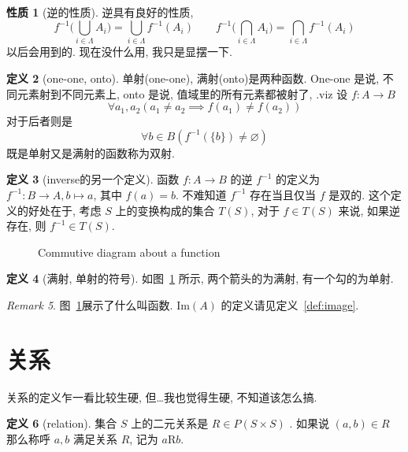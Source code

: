 \documentclass[10pt]{ctexart}
\theoremstyle{definition}
\theoremstyle{definition}
\newtheorem{definition}{定义}[section]
\newtheorem{proposition}[definition]{性质}
\theoremstyle{plain}
\theoremstyle{remark}
\newtheorem{remark}[definition]{Remark}
\begin{document}
\begin{proposition}[逆的性质]
逆具有良好的性质, 
\begin{equation}
		f^{-1} \Big(\bigcup_{i \in \Lambda}A_{i}\Big) = \bigcup_{i \in \Lambda} f^{-1} (A_{i}) \qquad
		f^{-1} \Big(\bigcap_{i \in \Lambda}A_{i}\Big) = \bigcap_{i \in \Lambda} f^{-1} (A_{i})
\end{equation}
以后会用到的. 现在没什么用, 我只是显摆一下.
\end{proposition}
\begin{definition}[one-one, onto]
单射(one-one), 满射(onto)是两种函数. One-one 是说, 不同元素射到不同元素上, onto 是说, 值域里的所有元素都被射了, .viz
设 \(f \colon A \to B\) 
\begin{equation}
	\forall a_{1} , a_{2} ( a_{1} \ne a_{2} \implies f (a_{1} ) \ne f (a_{2}) )
\end{equation}
对于后者则是
\begin{equation}
	\forall b \in B ( f^{-1} ( \{ b\} ) \ne \varnothing )
\end{equation}
既是单射又是满射的函数称为双射. 
\end{definition}
\begin{definition}[inverse的另一个定义]
	函数 \(f \colon A \to B \) 的逆 \(f ^{-1} \) 的定义为 \(f ^{-1} \colon B \to A , b \mapsto a\), 其中 \(f (a) = b\). 不难知道 \(f ^{-1}\) 存在当且仅当 \(f\) 是双的. 
	这个定义的好处在于, 考虑 \(S\) 上的变换构成的集合 \(T(S)\), 对于 \(f \in T (S)\) 来说, 如果逆存在, 则 \(f ^{-1} \in T (S)\). 
\end{definition}


\begin{figure}
\centering
{}
\caption{Commutive diagram about a function}\label{fig:func}
\end{figure}
\begin{definition}[满射, 单射的符号]
	如图~\ref{fig:func} 所示, 两个箭头的为满射, 有一个勾的为单射. 
\end{definition}
\begin{remark}
	图~\ref{fig:func}展示了什么叫函数. \(\mathrm{Im} (A)\) 的定义请见定义~\ref{def:image}.
\end{remark}

\section{关系}\label{sec:relation}
关系的定义乍一看比较生硬, 但\dots 我也觉得生硬, 不知道该怎么搞. 
\begin{definition}[relation]
	集合 \(S\) 上的二元关系是 \(R \in P (S \times S )\) . 如果说 \( (a , b) \in R\) 那么称呼 \(a, b \) 满足关系 \(R\), 记为 \(a \mathrm{R} b\). 
\end{definition}
\end{document}
